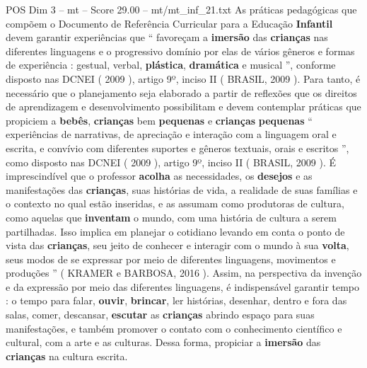 \begin{textsample}{POS Dim 3 – mt – Score 29.00 – mt/mt\_inf\_21.txt}
As práticas pedagógicas que compõem o Documento de Referência Curricular para a Educação \textbf{Infantil} devem garantir experiências que “ favoreçam a \textbf{imersão} das \textbf{crianças} nas diferentes linguagens e o progressivo domínio por elas de vários gêneros e formas de experiência : gestual, verbal, \textbf{plástica}, \textbf{dramática} e musical ”, conforme disposto nas DCNEI ( 2009 ), artigo 9º, inciso II ( BRASIL, 2009 ).
Para tanto, é necessário que o planejamento seja elaborado a partir de reflexões que os direitos de aprendizagem e desenvolvimento possibilitam e devem contemplar práticas que propiciem a \textbf{bebês}, \textbf{crianças} bem \textbf{pequenas} e \textbf{crianças} \textbf{pequenas} “ experiências de narrativas, de apreciação e interação com a linguagem oral e escrita, e convívio com diferentes suportes e gêneros textuais, orais e escritos ”, como disposto nas DCNEI ( 2009 ), artigo 9º, inciso II ( BRASIL, 2009 ).
É imprescindível que o professor \textbf{acolha} as necessidades, os \textbf{desejos} e as manifestações das \textbf{crianças}, suas histórias de vida, a realidade de suas famílias e o contexto no qual estão inseridas, e as assumam como produtoras de cultura, como aquelas que \textbf{inventam} o mundo, com uma história de cultura a serem partilhadas.
Isso implica em planejar o cotidiano levando em conta o ponto de vista das \textbf{crianças}, seu jeito de conhecer e interagir com o mundo à sua \textbf{volta}, seus modos de se expressar por meio de diferentes linguagens, movimentos e produções ” ( KRAMER e BARBOSA, 2016 ).
Assim, na perspectiva da invenção e da expressão por meio das diferentes linguagens, é indispensável garantir tempo : o tempo para falar, \textbf{ouvir}, \textbf{brincar}, ler histórias, desenhar, dentro e fora das salas, comer, descansar, \textbf{escutar} as \textbf{crianças} abrindo espaço para suas manifestações, e também promover o contato com o conhecimento científico e cultural, com a arte e as culturas.
Dessa forma, propiciar a \textbf{imersão} das \textbf{crianças} na cultura escrita.

\end{textsample}
